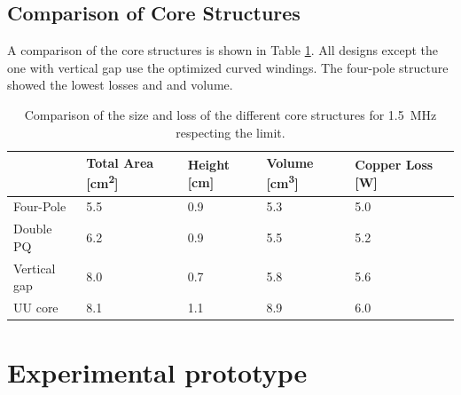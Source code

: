 \documentclass{IPEC2026}
\newcommand{\sbl}[1]{\glssymbol{#1}}
\begin{document}
\subsection{Comparison of Core Structures}
A comparison of the core structures is shown in Table \ref{tab:InductorComparison}. All designs except the one with vertical gap use the optimized curved windings. The four-pole structure showed the lowest losses and and volume.
\begin{table}
  \centering
  \caption{Comparison of the size and loss of the different core structures for \qty{1.5}{\MHz} respecting the \sbl{Hdc} limit.}
    \begin{tabularx}{\columnwidth}{|l|X|X|X|X|}
      \hline
          & {Total Area [\unit{\cm\squared}]} & {Height [\unit{\cm}]} & {Volume [\unit{\cubic\cm}]} & {Copper Loss [\unit{\W}]} \\
      \hline
      \hline
      Four-Pole & 5.5 & 0.9 & 5.3 & 5.0 \\
      \hline
      Double PQ & 6.2 & 0.9 & 5.5 & 5.2 \\
      \hline
      Vertical gap & 8.0 & 0.7 & 5.8 & 5.6 \\
      \hline
      UU core & 8.1 & 1.1 & 8.9 & 6.0 \\
      \hline
    \end{tabularx}%
  \label{tab:InductorComparison}%
\end{table}%

\section{Experimental prototype}
\end{document}
